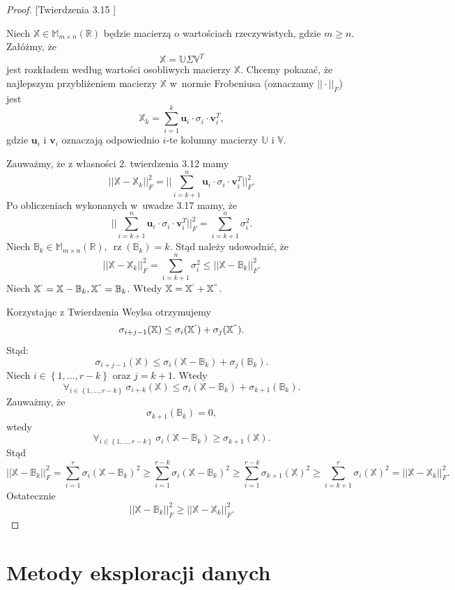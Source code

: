 \documentclass[12pt,a4paper]{report}
\newcommand{\set}[1]{\left\lbrace {#1} \right\rbrace}
\newcommand{\setR}{\mathbb{R}}
\newcommand{\rz}[1]{\operatorname{rz}\left({#1} \right)}
\begin{document}
\begin{proof}{[Twierdzenia 3.15 {\citep[Tw. 4.21]{tsvdalra}}]} 

Niech $\mathbb{X} \in \mathbb{M}_{m\times n}(\setR)$ będzie macierzą o wartościach rzeczywistych, gdzie $m \geqslant n$.
Załóżmy, że
$$
\mathbb{X}=\mathbb{U} \Sigma \mathbb{V}^T
$$
jest rozkładem według wartości osobliwych macierzy $\mathbb{X}$.
Chcemy pokazać, że najlepszym przybliżeniem macierzy $\mathbb{X}$ w~normie Frobeniusa (oznaczamy $||\cdot||_F$) jest
$$
\mathbb{X}_k = \sum_{i=1}^k \mathbf{u}_i\cdot \sigma_i \cdot \mathbf{v}_i^T,
$$
gdzie $\mathbf{u}_i$ i $\mathbf{v}_i$ oznaczają odpowiednio $i$-te kolumny macierzy $\mathbb{U}$ i $\mathbb{V}$.

Zauważmy, że z własności 2. twierdzenia 3.12 mamy
$$
||\mathbb{X} - \mathbb{X}_k||_F^2 = ||\sum_{i=k+1}^n \mathbf{u}_i \cdot \sigma_i \cdot \mathbf{v}_i^T||_F^2.
$$
Po obliczeniach wykonanych w~uwadze 3.17 mamy, że
$$
||\sum_{i=k+1}^n \mathbf{u}_i \cdot \sigma_i \cdot \mathbf{v}_i^T||_F^2 =\sum_{i=k+1}^n \sigma_i^2.
$$
Niech $\mathbb{B}_k \in \mathbb{M}_{m \times n}(\setR), \: \rz{\mathbb{B}_k} = k$. 
Stąd należy udowodnić, że
$$
||\mathbb{X} - \mathbb{X}_k||_F^2 = \sum_{i=k+1}^n \sigma_i^2 \leqslant ||\mathbb{X} - \mathbb{B}_k||_F^2.
$$
Niech $\mathbb{X}^{`} = \mathbb{X}-\mathbb{B}_k, \mathbb{X}^{``} = \mathbb{B}_k$.
Wtedy $\mathbb{X} = \mathbb{X}^{`} + \mathbb{X}^{``}$. 

Korzystając z Twierdzenia Weylsa otrzymujemy
$$
\sigma_{i+j-1}(\mathbb{X})\leq \sigma_{i}(\mathbb{X}^{`}) + \sigma_j(\mathbb{X}^{``}).
$$ 
Stąd:
$$
\sigma_{i+j-1}(\mathbb{X})\leq \sigma_{i}(\mathbb{X} - \mathbb{B}_k) + \sigma_j(\mathbb{B}_k).
$$ 
Niech $i \in \set{1, \ldots, r-k}$ oraz $j= k+1$. Wtedy
$$
\forall_{i \in \set{1, \ldots, r-k}} \: \sigma_{i+k}(\mathbb{X})\leq \sigma_{i}(\mathbb{X} - \mathbb{B}_k) + \sigma_{k+1}(\mathbb{B}_k).
$$ 
Zauważmy, że
$$
\sigma_{k+1}(\mathbb{B}_k)=0,
$$
wtedy
$$
\forall_{i \in \set{1, \ldots, r-k}} \: \sigma_i(\mathbb{X}-\mathbb{B}_k)\geq \sigma_{k+1}(\mathbb{X}).
$$
Stąd
$$
||\mathbb{X} - \mathbb{B}_k||_F^2 = \sum_{i=1}^r \sigma_i(\mathbb{X}-\mathbb{B}_k)^2 \geq \sum_{i=1}^{r-k} \sigma_i(\mathbb{X}-\mathbb{B}_k)^2 \geq \sum_{i=1}^{r-k} \sigma_{k+1}(\mathbb{X})^2 \geq \sum_{i = k+1}^r \sigma_i(\mathbb{X})^2 = ||\mathbb{X}-\mathbb{X}_k||_F^2 .
$$
Ostatecznie
$$
||\mathbb{X} - \mathbb{B}_k||_F^2 \geqslant ||\mathbb{X}-\mathbb{X}_k||_F^2.
$$
\end{proof}


\section{Metody eksploracji danych}
\end{document}
